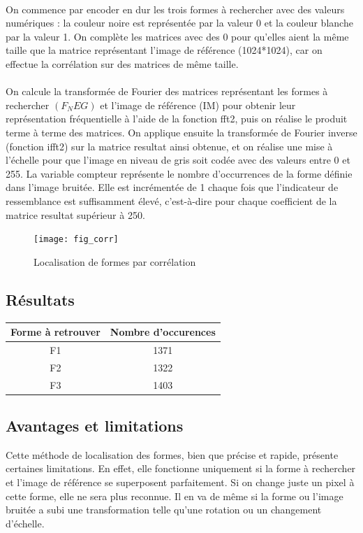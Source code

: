 \documentclass{article}
\begin{document}
\paragraph{}
\justifying
On commence par encoder en dur les trois formes à rechercher avec des valeurs numériques : la couleur noire est représentée par la valeur 0 et la couleur blanche par la valeur 1. On complète les matrices avec des 0 pour qu’elles aient la même taille que la matrice représentant l’image de référence (1024*1024), car on effectue la corrélation sur des matrices de même taille. 
\paragraph{}
\justifying 
	On calcule la transformée de Fourier des matrices représentant les formes à rechercher $(F_NEG)$ et l’image de référence (IM) pour obtenir leur représentation fréquentielle à l’aide de la fonction fft2, puis on réalise le produit terme à terme des matrices. On applique ensuite la transformée de Fourier inverse (fonction ifft2) sur la matrice resultat ainsi obtenue, et on réalise une mise à l’échelle pour que l’image en niveau de gris soit codée avec des valeurs entre 0 et 255. La variable compteur représente le nombre d’occurrences de la forme définie dans l’image bruitée. Elle est incrémentée de 1 chaque fois que l’indicateur de ressemblance est suffisamment élevé, c’est-à-dire pour chaque coefficient de la matrice resultat supérieur à 250.  
\begin{figure}
\texttt{[image: fig\_corr]}
\centering
\caption {Localisation de formes par corrélation}
\end{figure}
\subsection{Résultats}
\centering
\begin{tabular}{|c||c|}
        \hline
        Forme à retrouver & Nombre d'occurences \\ 
        \hline
        F1 & 1371\\ 
        \hline
	  F2 & 1322\\
        \hline
	  F3 & 1403\\
	 \hline
\end{tabular} 
\flushleft
\subsection {Avantages et limitations}
\justifying
Cette méthode de localisation des formes, bien que précise et rapide, présente certaines limitations. En effet, elle fonctionne uniquement si la forme à rechercher et l’image de référence se superposent parfaitement. Si on change juste un pixel à cette forme, elle ne sera plus reconnue. Il en va de même si la forme ou l’image bruitée a subi une transformation telle qu’une rotation ou un changement d’échelle. 
\end{document}
